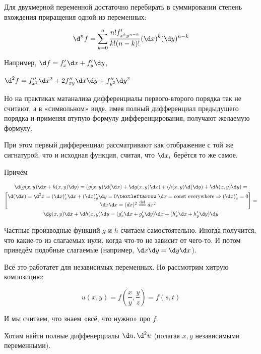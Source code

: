 \documentclass[12pt, a4paper]{article}
\begin{document}
Для двухмерной переменной достаточно перебирать в суммировании степень вхождения приращения одной из переменных:

\begin{equation}
  \d^n  f = \sum_{k = 0}^{n} 
  \frac{n! f'_{x^k y^{n - k}} } {k! (n - k)!} (\d x)^k (\d y)^{n - k}
\end{equation}

Например, $\d f = f'_x \d x + f'_y \d y$, 

$\d^2 f = f''_{x^2} \d x^2 + 2 f''_{xy} \d x \d y + f''_{y^2} \d y^2$

Но на практиках матанализа дифференциалы первого-второго порядка так не считают, а 
в «символьном» виде, имея полный дифференциал предыдущего порядка и применяя втупую формулу дифференцирования, получают желаемую формулу.

При этом первый дифференциал рассматривают как отображение с той же сигнатурой, что и исходная функция,
считая, что $\d x_i$ берётся то же самое.

Причём 

\begin{multline}
  \d(g(x, y)\d x + h(x, y)\d y) = (g(x, y) \d(\d x) + \d g(x, y) \d x) + (h(x, y) \d(\d y) + \d h(x, y) \d y) = \\
  \begin{bmatrix}
    \d(\d x) = \d^2 x = (\d x)'_x \d x + (\d x)'_y \d y = 0 ← \d x = \mathrm{const\ everywhere} \Rightarrow (\d x)'_x = 0 \\
    \d x \d x = (dx)^2 \eqdef dx^2
  \end{bmatrix} = \\
  \d g(x, y) \d x + \d h(x, y) \d y = (g'_x \d x + g'_y \d y) \d x + (h'_x \d x + h'_y \d y) \d y
\end{multline}

Частные производные функций $g$ и $h$ считаем самостоятельно.
Иногда получится, что какие-то из слагаемых нули, когда что-то не зависит от чего-то.
И потом приведём подобные слагаемые (например, $\d x \d y = \d y \d x$).

Всё это работатет для независимых переменных. 
Но рассмотрим хитрую композицию:

\begin{equation}
  u(x, y) = f \left( \frac{x}{y}, \frac{y}{z} \right) = f \left( s, t \right)
\end{equation}

И мы считаем, что знаем «всё, что нужно» про $f$.

Хотим найти полные диффенерциалы $\d u, \d^2 u$ (полагая $x, y$ независимыми переменными).
\end{document}
